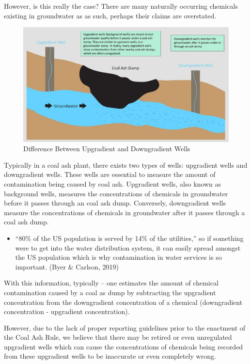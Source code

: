 \documentclass[12pt, twoside]{amherstthesis}
\providecommand{\tightlist}{%
  \setlength{\itemsep}{0pt}\setlength{\parskip}{0pt}}
\begin{document}
However, is this really the case? There are many naturally occurring chemicals existing in groundwater as as such, perhaps their claims are overstated.
\begin{figure}

{\centering \includegraphics[width=1\linewidth]{figures/upgradientdowngradient} 

}

\caption{Difference Between Upgradient and Downgradient Wells}\label{fig:upgradientdowngradient}
\end{figure}
Typically in a coal ash plant, there exists two types of wells: upgradient wells and downgradient wells. These wells are essential to measure the amount of contamination being caused by coal ash. Upgradient wells, also known as background wells, measures the concentrations of chemicals in groundwater before it passes through an coal ash dump. Conversely, downgradient wells measure the concentrations of chemicals in groundwater after it passes through a coal ash dump.
\begin{itemize}
\tightlist
\item
  ``80\% of the US population is served by 14\% of the utilities,'' so if something were to get into the water distribution system, it can easily spread amongst the US population which is why contamination in water services is so important. (Byer \& Carlson, 2019)
\end{itemize}
With this information, typically -- one estimates the amount of chemical contamination caused by a coal as dump by subtracting the upgradient concentration from the downgradient concentration of a chemical (downgradient concentration - upgradient concentration).

However, due to the lack of proper reporting guidelines prior to the enactment of the Coal Ash Rule, we believe that there may be retired or even unregulated upgradient wells which can cause the concentrations of chemicals being recorded from these upgradient wells to be inaccurate or even completely wrong.
\end{document}
